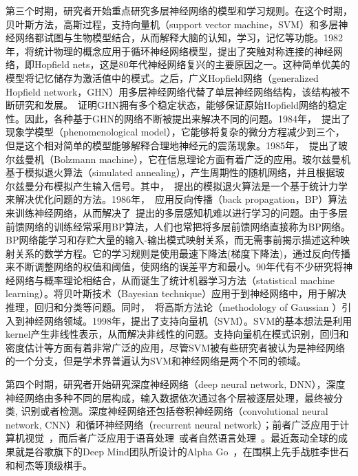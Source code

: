 第三个时期，研究者开始重点研究多层神经网络的模型和学习规则。在这个时期，贝叶斯方法，高斯过程，支持向量机（support vector machine，SVM）和多层神经网络都试图与生物模型结合，从而解释大脑的认知，学习，记忆等功能。1982年，\citet{hopfield1982neural}将统计物理的概念应用于循环神经网络模型，提出了突触对称连接的神经网络，即Hopfield nets，这是80年代神经网络复兴的主要原因之一。这种简单优美的模型将记忆储存为激活值中的模式。之后，广义Hopfield网络（generalized Hopfield network，GHN）用多层神经网络代替了单层神经网络结构，该结构被不断研究和发展。~\citet{zurada1996generalized}证明GHN拥有多个稳定状态，能够保证原始Hopfield网络的稳定性。因此，各种基于GHN的网络不断被提出来解决不同的问题。1984年，~\citet{hindmarsh1984model}提出了现象学模型（phenomenological model），它能够将复杂的微分方程减少到三个，但是这个相对简单的模型能够解释合理地神经元的震荡现象。1985年，~\citet{ackley1985learning}提出了玻尔兹曼机（Bolzmann machine），它在信息理论方面有着广泛的应用。玻尔兹曼机基于模拟退火算法（simulated annealing），产生周期性的随机网络，并且根据玻尔兹曼分布模拟产生输入信号。其中，~\citet{kirkpatrick1983optimization, vcerny1985thermodynamical}提出的模拟退火算法是一个基于统计力学来解决优化问题的方法。1986年，~\citet{rumelhart1986learning}应用反向传播（back propagation，BP）算法来训练神经网络，从而解决了~\citet{minsky1969perceptron}提出的多层感知机难以进行学习的问题。由于多层前馈网络的训练经常采用BP算法，人们也常把将多层前馈网络直接称为BP网络。BP网络能学习和存贮大量的输入-输出模式映射关系，而无需事前揭示描述这种映射关系的数学方程。它的学习规则是使用最速下降法(梯度下降法)，通过反向传播来不断调整网络的权值和阈值，使网络的误差平方和最小。90年代有不少研究将神经网络与概率理论相结合，从而诞生了统计机器学习方法（statistical machine learning）。\citet{mackay1992practical, bishop1995neural}将贝叶斯技术（Bayesian technique）应用于到神经网络中，用于解决推理，回归和分类等问题。同时，~\citet{williams1996gaussian}将高斯方法论（methodology of Gaussian ）引入到神经网络领域。1998年，\citet{vapnik1998statistical}提出了支持向量机（SVM）。SVM的基本想法是利用kernel产生非线性表示，从而解决非线性的问题。支持向量机在模式识别，回归和密度估计等方面有着非常广泛的应用，尽管SVM被有些研究者被认为是神经网络的一个分支，但是学术界普遍认为SVM和神经网络是两个不同的领域。

第四个时期，研究者开始研究深度神经网络（deep neural network, DNN），深度神经网络由多种不同的层构成，输入数据依次通过各个层被逐层处理，最终被分类, 识别或者检测。深度神经网络还包括卷积神经网络（convolutional neural network, CNN）和循环神经网络（recurrent neural network）；前者广泛应用于计算机视觉~\cite{krizhevsky2012imagenet,simonyan2014very, ren2015faster}，而后者广泛应用于语音处理~\cite{hinton2012deep, amodei2015deep, ze2013statistical}或者自然语言处理~\cite{conneau2016very}。最近轰动全球的成果就是谷歌旗下的Deep Mind团队所设计的Alpha Go~\cite{moyer2016google}，在围棋上先手战胜李世石和柯杰等顶级棋手。

